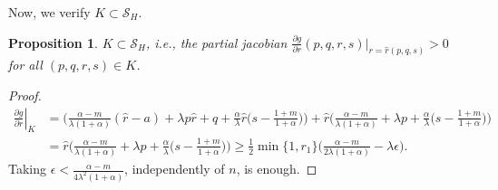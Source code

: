\documentclass[a4paper,11pt]{article}
\newtheorem{proposition}{Proposition}[section]
\theoremstyle{remark}
\begin{document}
Now, we verify $K\subset \mathcal{S}_H$. 
\begin{proposition}
$K\subset \mathcal{S}_H$, i.e., the partial jacobian $\frac{\partial g}{\partial r}(p,q,r,s)|_{r=\hat{r}(p,q,s)} >0 $ for all $(p,q,r,s)\in K$. %
\end{proposition}
\begin{proof}
 \begin{align*}
 \left.\frac{\partial g}{\partial r}\right|_{K} &= \Big(\frac{\alpha-m}{\lambda(1+\alpha)}(\hat{r}-a) + \lambda p\hat{r} + q +\frac{\alpha}{\lambda}\hat{r}\big(s- \frac{1+m}{1+\alpha}\big)\Big) + \hat{r}\Big(\frac{\alpha-m}{\lambda(1+\alpha)} + \lambda p + \frac{\alpha}{\lambda}\big(s- \frac{1+m}{1+\alpha}\big)\Big)\\
 &= \hat{r}\Big(\frac{\alpha-m}{\lambda(1+\alpha)} + \lambda p + \frac{\alpha}{\lambda}\big(s- \frac{1+m}{1+\alpha}\big) \Big)\ge \frac{1}{2}\min\{1,r_1\}\Big(\frac{\alpha-m}{2\lambda(1+\alpha)} - \lambda \epsilon\Big).
 \end{align*}
 Taking $\epsilon < \frac{\alpha-m}{4\lambda^2(1+\alpha)}$, independently of $n$, is enough.
\end{proof}
\end{document}
